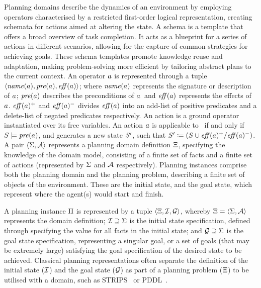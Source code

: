 Planning domains describe the dynamics of an environment by employing operators characterised by a restricted first-order logical representation, creating schemata for actions aimed at altering the state. A schema is a template that offers a broad overview of task completion. It acts as a blueprint for a series of actions in different scenarios, allowing for the capture of common strategies for achieving goals. These schema templates promote knowledge reuse and adaptation, making problem-solving more efficient by tailoring abstract plans to the current context.
An operator $a$ is represented through a tuple $\left\langle\mathit{name}(a),\mathit{pre}(a),\mathit{eff}(a)\right\rangle$; where $\mathit{name}(a)$ represents the signature or description of $a$; $\mathit{pre}(a)$ describes the preconditions of $a$~and $\mathit{eff}(a)$ represents the effects of~$a$. $\mathit{eff}(a)^+$ and $\mathit{eff}(a)^-$ divides $\mathit{eff}(a)$ into an add-list of positive predicates and a delete-list of negated predicates respectively. An action is a ground operator instantiated over its free variables. 
An action $a$ is applicable to \states~if and only if $S\models\mathit{pre}(a)$, and generates a new state $S'$, such that $S'\coloneqq(S\cup\mathit{eff}(a)^+/\mathit{eff}(a)^-)$. 
A pair $\left\langle\Sigma,\mathcal{A}\right\rangle$ represents a planning domain definition $\Xi$, specifying the knowledge of the domain model, consisting of a finite set of facts and a finite set of actions (represented by $\Sigma$ and $\mathcal{A}$ respectively).
Planning instances comprise both the planning domain and the planning problem, describing a finite set of objects of the environment. These are the initial state, and the goal state, which represent where the agent(s) would start and finish.

A planning instance $\Pi$ is represented by a tuple $\left\langle\Xi,\mathcal{I},\mathcal{G}\right\rangle$, whereby $\Xi=\left\langle\Sigma,\mathcal{A}\right\rangle$ represents the domain definition; $\mathcal{I}\supseteq\Sigma$ is the initial state specification, defined through specifying the value for all facts in the initial state; and $\mathcal{G}\supseteq\Sigma$ is the goal state specification, representing a singular goal, or a set of goals (that may be extremely large) satisfying the goal specification of the desired state to be achieved.
Classical planning representations often separate the definition of the initial state ($\mathcal{I}$) and the goal state ($\mathcal{G}$) as part of a planning problem ($\Xi$) to be utilised with a domain, such as STRIPS~\cite{Fikes1971} or PDDL~\cite{PDDL1998}.

